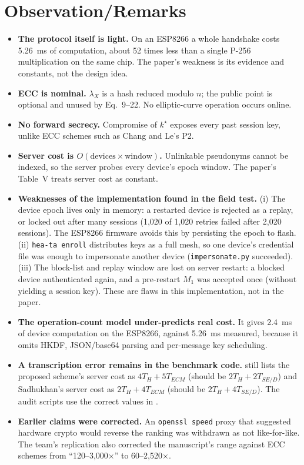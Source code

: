 \documentclass[12pt,a4paper,oneside]{report}
\numberwithin{equation}{chapter}
\begin{document}
\section{Observation/Remarks}
\label{sec:obs}
\begin{itemize}
  \item \textbf{The protocol itself is light.} On an ESP8266 a whole handshake costs 5.26~ms of computation, about 52 times less than a single P-256 multiplication on the same chip. The paper's weakness is its evidence and constants, not the design idea.
  \item \textbf{ECC is nominal.} $\lambda_X$ is a hash reduced modulo $n$; the public point is optional and unused by Eq.~9--22. No elliptic-curve operation occurs online.
  \item \textbf{No forward secrecy.} Compromise of $k^\star$ exposes every past session key, unlike ECC schemes such as Chang and Le's P2.
  \item \textbf{Server cost is $O(\text{devices}\times\text{window})$.} Unlinkable pseudonyms cannot be indexed, so the server probes every device's epoch window. The paper's Table~V treats server cost as constant.
  \item \textbf{Weaknesses of the implementation found in the field test.} (i) The device epoch lives only in memory: a restarted device is rejected as a replay, or locked out after many sessions (1{,}020 of 1{,}020 retries failed after 2{,}020 sessions). The ESP8266 firmware avoids this by persisting the epoch to flash. (ii) \texttt{hea-ta enroll} distributes keys as a full mesh, so one device's credential file was enough to impersonate another device (\texttt{impersonate.py} succeeded). (iii) The block-list and replay window are lost on server restart: a blocked device authenticated again, and a pre-restart $M_1$ was accepted once (without yielding a session key). These are flaws in this implementation, not in the paper.
  \item \textbf{The operation-count model under-predicts real cost.} It gives 2.4~ms of device computation on the ESP8266, against 5.26~ms measured, because it omits HKDF, JSON/base64 parsing and per-message key scheduling.
  \item \textbf{A transcription error remains in the benchmark code.}  still lists the proposed scheme's server cost as $4T_H+5T_{ECM}$ (should be $2T_H+2T_{SE/D}$) and Sadhukhan's server cost as $2T_H+4T_{ECM}$ (should be $2T_H+4T_{SE/D}$). The audit scripts use the correct values in .
  \item \textbf{Earlier claims were corrected.} An \texttt{openssl speed} proxy that suggested hardware crypto would reverse the ranking was withdrawn as not like-for-like. The team's replication also corrected the manuscript's range against ECC schemes from ``120--3{,}000$\times$'' to 60--2{,}520$\times$.
\end{itemize}
\end{document}
